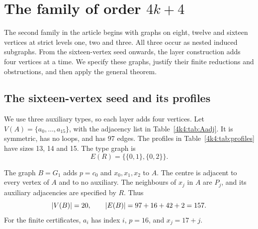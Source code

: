 \section{The family of order \texorpdfstring{$4k+4$}{4k+4}}\label{sec:family4}
The second family in the article begins with graphs on eight, twelve and
sixteen vertices at strict levels one, two and three. All three occur as
nested induced subgraphs. From the sixteen-vertex seed onwards, the layer
construction adds four vertices at a time. We specify these graphs, justify
their finite reductions and obstructions, and then apply the general theorem.

\subsection{The sixteen-vertex seed and its profiles}\label{4k4:sec:seed}
We use three auxiliary types, so each layer adds four vertices. Let
\(V(A)=\{a_0,\ldots,a_{15}\}\), with the adjacency list in
Table~\ref{4k4:tab:Aadj}. It is symmetric, has no loops, and has 97 edges.
The profiles in Table~\ref{4k4:tab:profiles} have sizes 13, 14 and 15.
The type graph is
\begin{equation}\label{4k4:eq:R}
E(R)=\{\{0,1\},\{0,2\}\}.
\end{equation}


The graph \(B=G_1\) adds \(p=c_0\) and \(x_0,x_1,x_2\) to \(A\).
The centre is adjacent to every vertex of \(A\) and to no auxiliary.
The neighbours of \(x_j\) in \(A\) are \(P_j\), and its auxiliary
adjacencies are specified by \(R\). Thus
\[
\lvert V(B)\rvert=20,\qquad \lvert E(B)\rvert=97+16+42+2=157.
\]
For the finite certificates, \(a_i\) has index \(i\), \(p=16\),
and \(x_j=17+j\). 
